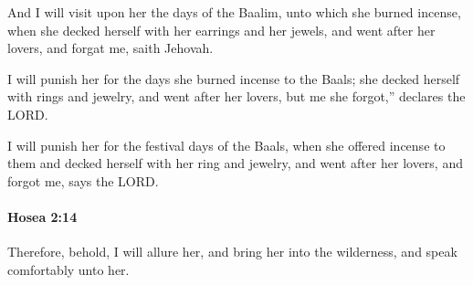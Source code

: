 			\begin{versebox}
					\item[BHS] 
					\item[LXX] 
					\item[ASV] And I will visit upon her the days of the Baalim, unto which she burned incense, when she decked herself with her earrings and her jewels, and went after her lovers, and forgat me, saith Jehovah.
					\item[NIV] I will punish her for the days she burned incense to the Baals; she decked herself with rings and jewelry, and went after her lovers, but me she forgot,” declares the LORD.
					\item[NRSV] I will punish her for the festival days of the Baals, when she offered incense to them and decked herself with her ring and jewelry, and went after her lovers, and forgot me, says the LORD.
			\end{versebox}

		\paragraph{Hosea 2:14} %
			\label{HOSEA-2-14}

			Therefore, behold, I will allure her, and bring her into the wilderness, and speak comfortably unto her.

